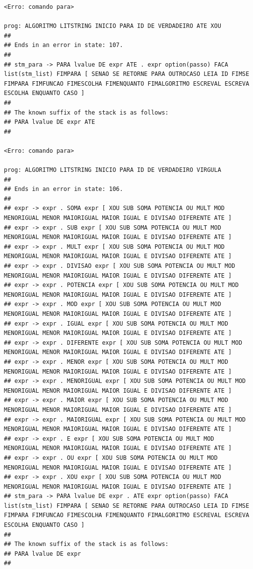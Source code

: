 \documentclass[hidelinks,12pt]{article}
\begin{document}
\begin{lstlisting}
<Erro: comando para>

prog: ALGORITMO LITSTRING INICIO PARA ID DE VERDADEIRO ATE XOU 
##
## Ends in an error in state: 107.
##
## stm_para -> PARA lvalue DE expr ATE . expr option(passo) FACA list(stm_list) FIMPARA [ SENAO SE RETORNE PARA OUTROCASO LEIA ID FIMSE FIMPARA FIMFUNCAO FIMESCOLHA FIMENQUANTO FIMALGORITMO ESCREVAL ESCREVA ESCOLHA ENQUANTO CASO ]
##
## The known suffix of the stack is as follows:
## PARA lvalue DE expr ATE 
##

<Erro: comando para>

prog: ALGORITMO LITSTRING INICIO PARA ID DE VERDADEIRO VIRGULA 
##
## Ends in an error in state: 106.
##
## expr -> expr . SOMA expr [ XOU SUB SOMA POTENCIA OU MULT MOD MENORIGUAL MENOR MAIORIGUAL MAIOR IGUAL E DIVISAO DIFERENTE ATE ]
## expr -> expr . SUB expr [ XOU SUB SOMA POTENCIA OU MULT MOD MENORIGUAL MENOR MAIORIGUAL MAIOR IGUAL E DIVISAO DIFERENTE ATE ]
## expr -> expr . MULT expr [ XOU SUB SOMA POTENCIA OU MULT MOD MENORIGUAL MENOR MAIORIGUAL MAIOR IGUAL E DIVISAO DIFERENTE ATE ]
## expr -> expr . DIVISAO expr [ XOU SUB SOMA POTENCIA OU MULT MOD MENORIGUAL MENOR MAIORIGUAL MAIOR IGUAL E DIVISAO DIFERENTE ATE ]
## expr -> expr . POTENCIA expr [ XOU SUB SOMA POTENCIA OU MULT MOD MENORIGUAL MENOR MAIORIGUAL MAIOR IGUAL E DIVISAO DIFERENTE ATE ]
## expr -> expr . MOD expr [ XOU SUB SOMA POTENCIA OU MULT MOD MENORIGUAL MENOR MAIORIGUAL MAIOR IGUAL E DIVISAO DIFERENTE ATE ]
## expr -> expr . IGUAL expr [ XOU SUB SOMA POTENCIA OU MULT MOD MENORIGUAL MENOR MAIORIGUAL MAIOR IGUAL E DIVISAO DIFERENTE ATE ]
## expr -> expr . DIFERENTE expr [ XOU SUB SOMA POTENCIA OU MULT MOD MENORIGUAL MENOR MAIORIGUAL MAIOR IGUAL E DIVISAO DIFERENTE ATE ]
## expr -> expr . MENOR expr [ XOU SUB SOMA POTENCIA OU MULT MOD MENORIGUAL MENOR MAIORIGUAL MAIOR IGUAL E DIVISAO DIFERENTE ATE ]
## expr -> expr . MENORIGUAL expr [ XOU SUB SOMA POTENCIA OU MULT MOD MENORIGUAL MENOR MAIORIGUAL MAIOR IGUAL E DIVISAO DIFERENTE ATE ]
## expr -> expr . MAIOR expr [ XOU SUB SOMA POTENCIA OU MULT MOD MENORIGUAL MENOR MAIORIGUAL MAIOR IGUAL E DIVISAO DIFERENTE ATE ]
## expr -> expr . MAIORIGUAL expr [ XOU SUB SOMA POTENCIA OU MULT MOD MENORIGUAL MENOR MAIORIGUAL MAIOR IGUAL E DIVISAO DIFERENTE ATE ]
## expr -> expr . E expr [ XOU SUB SOMA POTENCIA OU MULT MOD MENORIGUAL MENOR MAIORIGUAL MAIOR IGUAL E DIVISAO DIFERENTE ATE ]
## expr -> expr . OU expr [ XOU SUB SOMA POTENCIA OU MULT MOD MENORIGUAL MENOR MAIORIGUAL MAIOR IGUAL E DIVISAO DIFERENTE ATE ]
## expr -> expr . XOU expr [ XOU SUB SOMA POTENCIA OU MULT MOD MENORIGUAL MENOR MAIORIGUAL MAIOR IGUAL E DIVISAO DIFERENTE ATE ]
## stm_para -> PARA lvalue DE expr . ATE expr option(passo) FACA list(stm_list) FIMPARA [ SENAO SE RETORNE PARA OUTROCASO LEIA ID FIMSE FIMPARA FIMFUNCAO FIMESCOLHA FIMENQUANTO FIMALGORITMO ESCREVAL ESCREVA ESCOLHA ENQUANTO CASO ]
##
## The known suffix of the stack is as follows:
## PARA lvalue DE expr 
##


\end{lstlisting}
\end{document}
